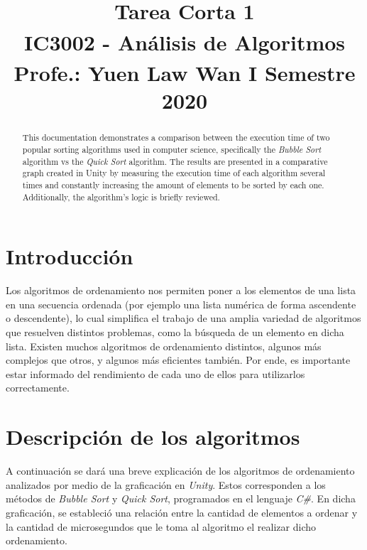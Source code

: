\documentclass[conference]{IEEEtran}
\begin{document}
\title{Tarea Corta 1\\
{\footnotesize \textsuperscript{}IC3002 - Análisis de Algoritmos}
{\footnotesize \textsuperscript{}Profe.: Yuen Law Wan}
{\footnotesize \textsuperscript{}I Semestre 2020}
}

\author{
\and
{}
}

\maketitle

\begin{abstract}
This documentation demonstrates a comparison between the execution time of two popular sorting algorithms used in computer science, specifically the \textit{Bubble Sort} algorithm vs the \textit{Quick Sort} algorithm. The results are presented in a comparative graph created in Unity by measuring the execution time of each algorithm several times and constantly increasing the amount of elements to be sorted by each one. Additionally, the algorithm’s logic is briefly reviewed. 
\end{abstract}


\section{Introducción}
Los algoritmos de ordenamiento nos permiten poner a los elementos de una lista en una secuencia ordenada (por ejemplo una lista numérica de forma ascendente o descendente), lo cual simplifica el trabajo de una amplia variedad de algoritmos que resuelven distintos problemas, como la búsqueda de un elemento en dicha lista. Existen muchos algoritmos de ordenamiento distintos, algunos más complejos que otros, y algunos más eficientes también. Por ende, es importante estar informado del rendimiento de cada uno de ellos para utilizarlos correctamente. 

\section{Descripción de los algoritmos}
A continuación se dará una breve explicación de los algoritmos de ordenamiento analizados por medio
de la graficación en \textit{Unity}. Estos corresponden a los métodos de \textit{Bubble Sort} y \textit{Quick Sort}, programados
en el lenguaje \textit{C\#}. En dicha graficación, se estableció una relación entre la cantidad de elementos a ordenar y
 la cantidad de microsegundos que le toma al algoritmo el realizar dicho ordenamiento. 
\end{document}
